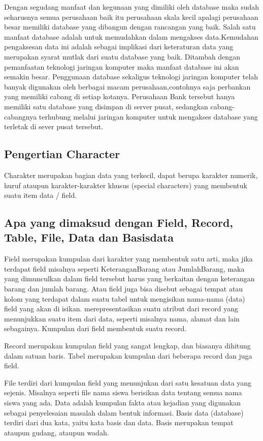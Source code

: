 	Dengan segudang manfaat dan kegunaan yang dimiliki oleh database maka sudah seharusnya semua perusahaan baik itu perusahaan skala kecil apalagi perusahaan besar memiliki database yang dibangun dengan rancangan yang baik. Salah satu manfaat database adalah untuk memudahkan dalam mengakses data.Kemudahan pengaksesan data ini adalah sebagai implikasi dari keteraturan data yang
merupakan syarat mutlak dari suatu database yang baik. Ditambah dengan pemanfaatan teknologi jaringan komputer maka manfaat database ini akan semakin besar. Penggunaan database sekaligus teknologi jaringan komputer telah banyak digunakan oleh berbagai macam perusahaan,contohnya saja perbankan yang memiliki cabang di setiap kotanya. Perusahaan Bank tersebut hanya memiliki satu database yang disimpan di server pusat, sedangkan cabang-cabangnya terhubung melalui jaringan komputer untuk mengakses database yang terletak di sever pusat tersebut.


\subsection {Pengertian Character}
	Charakter merupakan bagian data yang terkecil, dapat berupa karakter numerik, huruf ataupun karakter-karakter khusus (special characters) yang membentuk suatu item data / field.

\subsection {Apa yang dimaksud dengan Field, Record, Table, File, Data dan Basisdata} 
	Field merupakan kumpulan dari karakter yang membentuk satu arti, maka jika terdapat field misalnya seperti KeteranganBarang atau JumlahBarang, maka yang dimunculkan dalam field tersebut harus yang berkaitan dengan keterangan barang dan jumlah barang. Atau field juga bisa disebut sebagai tempat atau kolom yang terdapat dalam suatu tabel untuk mengisikan nama-nama (data) field yang akan di isikan. merepresentasikan suatu atribut dari record yang menunjukkan suatu item dari data, seperti misalnya nama, alamat dan lain sebagainya. Kumpulan dari field membentuk suatu record.

	Record merupakan kumpulan field yang sangat lengkap, dan biasanya dihitung dalam satuan baris. Tabel merupakan kumpulan dari beberapa record dan juga field. 
	
	File terdiri dari kumpulan field yang menunjukan dari satu kesatuan data yang sejenis. Misalnya seperti file nama siswa berisikan data tentang semua nama siswa yang ada. Data adalah kumpulan fakta atau kejadian yang digunakan sebagai penyelesaian masalah dalam bentuk informasi. Basis data (database) terdiri dari dua kata, yaitu kata basis dan data. Basis merupakan tempat ataupun gudang, ataupun wadah.

